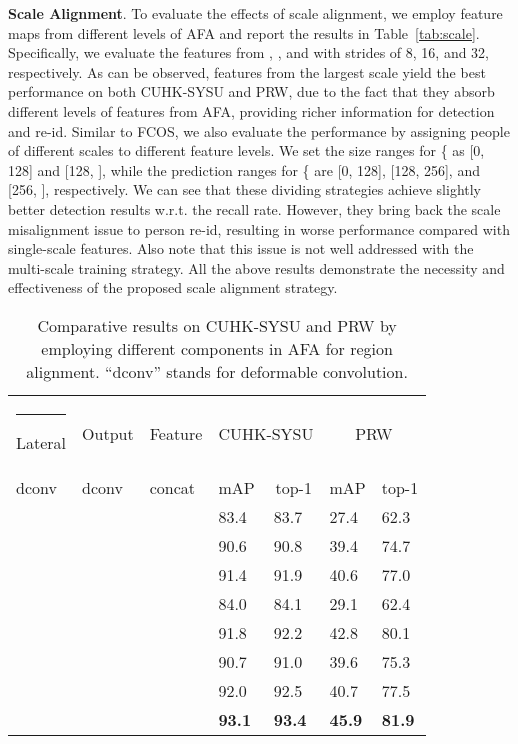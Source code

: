 \documentclass[journal]{IEEEtran}
\makeatletter
\newcommand{\thickhline}{\noalign {\ifnum 0=`}\fi \hrule height 1pt
    \futurelet \reserved@a \@xhline
}
\makeatother
\begin{document}
\textbf{Scale Alignment}. 
To evaluate the effects of scale alignment, we employ feature maps from different levels of AFA and report the results in Table~\ref{tab:scale}. Specifically, we evaluate the features from , , and  with strides of 8, 16, and 32, respectively. As can be observed, features from the largest scale  yield the best performance on both CUHK-SYSU and PRW, due to the fact that they absorb different levels of features from AFA, providing richer information for detection and re-id. Similar to FCOS, we also evaluate the performance by assigning people of different scales to different feature levels. We set the size ranges for \{ as [0, 128] and [128, ], while the prediction ranges for \{ are [0, 128], [128, 256], and [256, ], respectively. We can see that these dividing strategies achieve slightly better detection results w.r.t. the recall rate. However, they bring back the scale misalignment issue to person re-id, resulting in worse performance compared with single-scale features. Also note that this issue is not well addressed with the multi-scale training strategy. All the above results demonstrate the necessity and effectiveness of the proposed scale alignment strategy.





\begin{table}[t]
\small
\centering
\begin{tabular}{p{0.8cm}<{\centering}p{0.8cm}<{\centering}p{0.8cm}<{\centering}|p{0.8cm}<{\centering}p{0.8cm}<{\centering}|p{0.8cm}<{\centering}p{0.8cm}<{\centering}}
\hline\thickhline
\rowcolor{mygray}  
Lateral              & Output               & Feature              & \multicolumn{2}{c}{CUHK-SYSU}     & \multicolumn{2}{|c}{PRW}                   \\ \cline{4-7} 
\rowcolor{mygray}  
dconv                 & dconv                 & concat               & mAP                  & \multicolumn{1}{c}{top-1} & \multicolumn{1}{|c}{mAP}                  & \multicolumn{1}{c}{top-1} \\ 
\hline \hline  
 &   & & 83.4 & 83.7              & 27.4       & 62.3            \\ 
 &   & & 90.6 & 90.8        &39.4   &   74.7             \\
 &   & & 91.4 & 91.9          & 40.6   &    77.0              \\
  &   &  & 84.0 & 84.1         & 29.1  &     62.4              \\
 &   & & 91.8 & 92.2     & 42.8  &   80.1                    \\
 &   &  & 90.7 & 91.0     & 39.6  &   75.3                     \\
 &   & & 92.0 & 92.5       & 40.7  &    77.5                  \\
 &   &  & \textbf{93.1} & \textbf{93.4}    &  \textbf{45.9} &    \textbf{81.9}                  \\\hline
\end{tabular}
\caption{Comparative results on CUHK-SYSU and PRW by employing different components in AFA for region alignment. ``dconv'' stands for deformable convolution. }
\label{tab:region}
\end{table}
\end{document}

